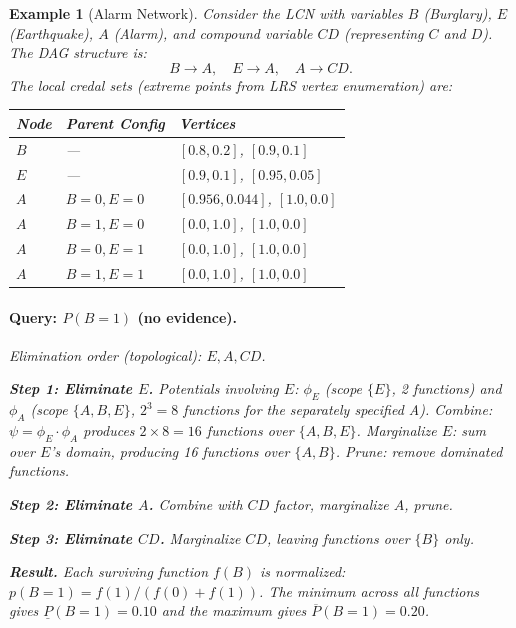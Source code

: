 \documentclass[11pt]{article}
\newtheorem{example}{Example}
\begin{document}
\begin{example}[Alarm Network]
Consider the LCN with variables $B$ (Burglary), $E$ (Earthquake), $A$ (Alarm),
and compound variable $CD$ (representing $C$ and $D$). The DAG structure is:
\[
  B \to A, \quad E \to A, \quad A \to CD.
\]
The local credal sets (extreme points from LRS vertex enumeration) are:

\begin{center}
\begin{tabular}{lll}
\toprule
\textbf{Node} & \textbf{Parent Config} & \textbf{Vertices} \\
\midrule
$B$ & --- & $[0.8, 0.2]$, $[0.9, 0.1]$ \\
$E$ & --- & $[0.9, 0.1]$, $[0.95, 0.05]$ \\
$A$ & $B{=}0, E{=}0$ & $[0.956, 0.044]$, $[1.0, 0.0]$ \\
$A$ & $B{=}1, E{=}0$ & $[0.0, 1.0]$, $[1.0, 0.0]$ \\
$A$ & $B{=}0, E{=}1$ & $[0.0, 1.0]$, $[1.0, 0.0]$ \\
$A$ & $B{=}1, E{=}1$ & $[0.0, 1.0]$, $[1.0, 0.0]$ \\
\bottomrule
\end{tabular}
\end{center}

\paragraph{Query: $P(B{=}1)$ (no evidence).}
Elimination order (topological): $E, A, CD$.

\textbf{Step 1: Eliminate $E$.}
Potentials involving $E$: $\phi_E$ (scope $\{E\}$, 2 functions) and $\phi_A$
(scope $\{A, B, E\}$, $2^3 = 8$ functions for the separately specified A).
Combine: $\psi = \phi_E \cdot \phi_A$ produces $2 \times 8 = 16$ functions
over $\{A, B, E\}$. Marginalize $E$: sum over $E$'s domain, producing 16
functions over $\{A, B\}$. Prune: remove dominated functions.

\textbf{Step 2: Eliminate $A$.}
Combine with $CD$ factor, marginalize $A$, prune.

\textbf{Step 3: Eliminate $CD$.}
Marginalize $CD$, leaving functions over $\{B\}$ only.

\textbf{Result.} Each surviving function $f(B)$ is normalized:
$p(B{=}1) = f(1) / (f(0) + f(1))$. The minimum across all functions gives
$\underline{P}(B{=}1) = 0.10$ and the maximum gives
$\overline{P}(B{=}1) = 0.20$.
\end{example}
\end{document}

